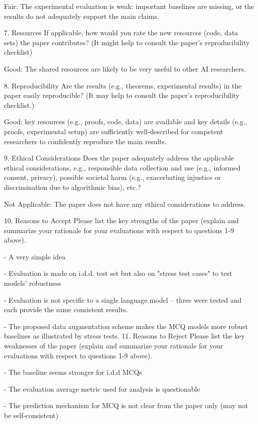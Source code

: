 \documentclass{article}
\begin{document}
Fair: The experimental evaluation is weak: important baselines are missing, or the results do not adequately support the main claims.

7. {Resources} If applicable, how would you rate the new resources (code, data sets) the paper contributes? (It might help to consult the paper’s reproducibility checklist)

Good: The shared resources are likely to be very useful to other AI researchers.

8. {Reproducibility} Are the results (e.g., theorems, experimental results) in the paper easily reproducible? (It may help to consult the paper’s reproducibility checklist.)

Good: key resources (e.g., proofs, code, data) are available and key details (e.g., proofs, experimental setup) are sufficiently well-described for competent researchers to confidently reproduce the main results.

9. {Ethical Considerations} Does the paper adequately address the applicable ethical considerations, e.g., responsible data collection and use (e.g., informed consent, privacy), possible societal harm (e.g., exacerbating injustice or discrimination due to algorithmic bias), etc.?

Not Applicable: The paper does not have any ethical considerations to address.

10. {Reasons to Accept} Please list the key strengths of the paper (explain and summarize your rationale for your evaluations with respect to questions 1-9 above).

- A very simple idea

- Evaluation is made on i.d.d. test set but also on "stress test cases" to test models’ robustness

- Evaluation is not specific to a single language model -- three were tested and each provide the same consistent results. 

- The proposed data augmentation scheme makes the MCQ models more robust baselines as illustrated by stress tests. 
11. {Reasons to Reject} Please list the key weaknesses of the paper (explain and summarize your rationale for your evaluations with respect to questions 1-9 above).

- The baseline seems stronger for i.d.d MCQs

- The evaluation average metric used for analysis is questionable

- The prediction mechanism for MCQ is not clear from the paper only (may not be self-consistent)
\end{document}
